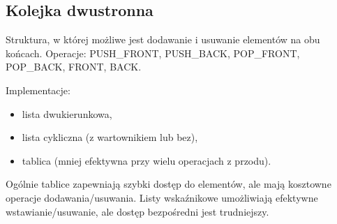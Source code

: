 \subsection*{Kolejka dwustronna}
Struktura, w której możliwe jest dodawanie i usuwanie elementów na obu końcach. Operacje: PUSH\_FRONT, PUSH\_BACK, POP\_FRONT, POP\_BACK, FRONT, BACK.

Implementacje:
\begin{itemize}
    \item lista dwukierunkowa,
    \item lista cykliczna (z wartownikiem lub bez),
    \item tablica (mniej efektywna przy wielu operacjach z przodu).
\end{itemize}

Ogólnie tablice zapewniają szybki dostęp do elementów, ale mają kosztowne operacje dodawania/usuwania. Listy wskaźnikowe umożliwiają efektywne wstawianie/usuwanie, ale dostęp bezpośredni jest trudniejszy. 